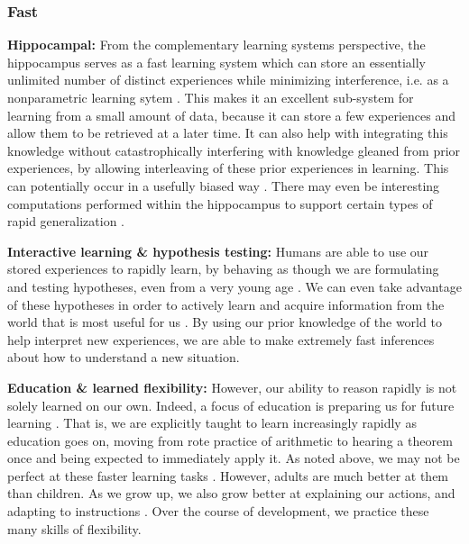 \documentclass[11pt]{article}
\begin{document}
\subsubsection{Fast}
\textbf{Hippocampal:} From the complementary learning systems perspective, the hippocampus serves as a fast learning system which can store an essentially unlimited number of distinct experiences while minimizing interference, i.e. as a nonparametric learning sytem \citep{Kumaran2016}. This makes it an excellent sub-system for learning from a small amount of data, because it can store a few experiences and allow them to be retrieved at a later time. It can also help with integrating this knowledge without catastrophically interfering \citep{McCloskey1989} with knowledge gleaned from prior experiences, by allowing interleaving of these prior experiences in learning. This can potentially occur in a usefully biased way \citep{Kumaran2016}. There may even be interesting computations performed within the hippocampus to support certain types of rapid generalization \citep{Kumaran2012}. \par 
\textbf{Interactive learning \& hypothesis testing:} Humans are able to use our stored experiences to rapidly learn, by behaving as though we are formulating and testing hypotheses, even from a very young age \citep{Sobel2004, Gopnik2014}. We can even take advantage of these hypotheses in order to actively learn and acquire information from the world that is most useful for us \citep[e.g.]{Markant2014a}. By using our prior knowledge of the world to help interpret new experiences, we are able to make extremely fast inferences about how to understand a new situation. \par
\textbf{Education \& learned flexibility:} However, our ability to reason rapidly is not solely learned on our own. Indeed, a focus of education is preparing us for future learning \citep{Bransford1999}. That is, we are explicitly taught to learn increasingly rapidly as education goes on, moving from rote practice of arithmetic to hearing a theorem once and being expected to immediately apply it. As noted above, we may not be perfect at these faster learning tasks \citep[e.g.]{Hazzan1999}. However, adults are much better at them than children. As we grow up, we also grow better at explaining our actions, and adapting to instructions \citep[e.g.]{Doebel2015}. Over the course of development, we practice these many skills of flexibility. \par 
\end{document}

